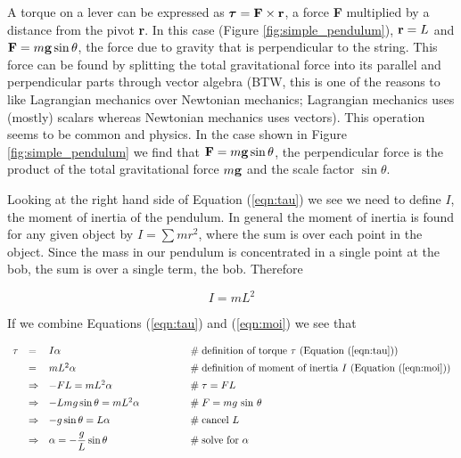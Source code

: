 \documentclass{article}
\theoremstyle{definition}
\begin{document}
\bigskip
\noindent
A torque on a lever can be expressed as $\boldsymbol{\tau} = {\bf
F} \times {\bf r}$, a force {\bf F} multiplied by a distance from
the pivot {\bf r}. In this case (Figure \ref{fig:simple_pendulum}),
${\bf r} = L$ and ${\bf F} = m {\bf g} \sin \theta$, the force due 
to gravity that is perpendicular to the string. This force can be 
found by splitting the total gravitational force into its parallel 
and perpendicular parts through vector algebra (BTW, this is one 
of the reasons to like Lagrangian mechanics over Newtonian 
mechanics; Lagrangian mechanics uses (mostly) scalars whereas 
Newtonian mechanics uses vectors). This operation seems to be 
common and physics. In the case shown in Figure \ref{fig:simple_pendulum} 
we find that ${\bf F} = m {\bf g} \sin \theta$, the perpendicular 
force is the product of the total gravitational force $m {\bf g}$ 
and the scale factor $\sin \theta$.


\bigskip
\noindent
Looking at the right hand side of Equation (\ref{eqn:tau}) we see
we need to define $I$, the moment of inertia of the pendulum.
In general the moment of inertia is found for any given object 
by $I =\sum mr^2$, where the sum is over each point in the object.
Since the mass in our pendulum is concentrated in a single point 
at the bob, the sum is over a single term, the bob. Therefore

\begin{equation}
I = mL^2
\label{eqn:moi}
\end{equation}

\bigskip
\noindent
If we combine Equations (\ref{eqn:tau}) and (\ref{eqn:moi}) we see 
that

\begin{equation*}
\begin{array}{llll}
\tau 
&=& I \alpha                                            &\qquad \qquad \mathrel{\#} \text{definition of
                                                          torque $\tau$ (Equation (\ref{eqn:tau}))} \\
[5pt]
&=& mL^2 \alpha                                         &\qquad \qquad \mathrel{\#} \text{definition of
                                                          moment of inertia $I$ (Equation (\ref{eqn:moi}))} \\
[5pt]
&\Rightarrow& -FL = mL^2 \alpha                         &\qquad \qquad \mathrel{\#} \tau = FL \\
[5pt]
&\Rightarrow& -L mg \sin \theta = mL^2 \alpha           &\qquad \qquad \mathrel{\#} F = mg \,\sin \, \theta \\
[5pt]
&\Rightarrow& - g \sin \theta = L \alpha                &\qquad \qquad \mathrel{\#} \text{cancel $L$} \\
[5pt]
&\Rightarrow& \alpha = - \dfrac{g}{L} \sin \theta       &\qquad \qquad \mathrel{\#} \text{solve for $\alpha$} \\
\end{array}
\end{equation*}
\end{document}
